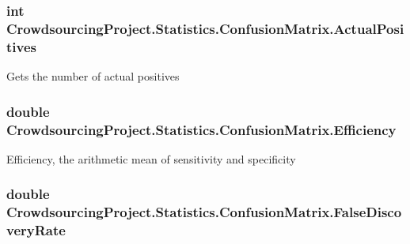 \subsubsection[{Actual\+Positives}]{\setlength{\rightskip}{0pt plus 5cm}int Crowdsourcing\+Project.\+Statistics.\+Confusion\+Matrix.\+Actual\+Positives\hspace{0.3cm}{\ttfamily [get]}}\label{class_crowdsourcing_project_1_1_statistics_1_1_confusion_matrix_a5e9d3164713343c5fb0b2181247c6629}


Gets the number of actual positives 

\hypertarget{class_crowdsourcing_project_1_1_statistics_1_1_confusion_matrix_a3450802726f22c62f6fbdf97e42451a8}{}
\subsubsection[{Efficiency}]{\setlength{\rightskip}{0pt plus 5cm}double Crowdsourcing\+Project.\+Statistics.\+Confusion\+Matrix.\+Efficiency\hspace{0.3cm}{\ttfamily [get]}}\label{class_crowdsourcing_project_1_1_statistics_1_1_confusion_matrix_a3450802726f22c62f6fbdf97e42451a8}


Efficiency, the arithmetic mean of sensitivity and specificity 

\hypertarget{class_crowdsourcing_project_1_1_statistics_1_1_confusion_matrix_a9cd513ee90fdf9d5746baf59a219725b}{}
\subsubsection[{False\+Discovery\+Rate}]{\setlength{\rightskip}{0pt plus 5cm}double Crowdsourcing\+Project.\+Statistics.\+Confusion\+Matrix.\+False\+Discovery\+Rate\hspace{0.3cm}{\ttfamily [get]}}\label{class_crowdsourcing_project_1_1_statistics_1_1_confusion_matrix_a9cd513ee90fdf9d5746baf59a219725b}


